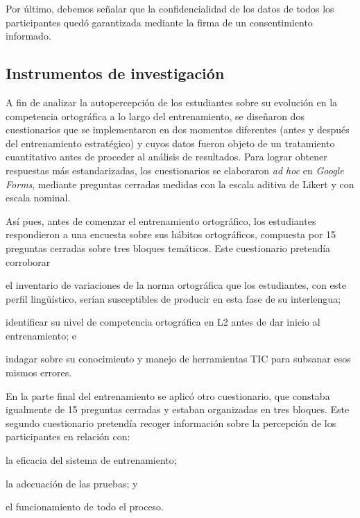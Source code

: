 \documentclass[spanish]{textolivre}
\begin{document}
Por último, debemos señalar que la confidencialidad de los datos de todos los participantes quedó garantizada mediante la firma de un consentimiento informado.

\subsection{Instrumentos de investigación}\label{sec-organizacao-latex}
A fin de analizar la autopercepción de los estudiantes sobre su evolución en la competencia ortográfica a lo largo del entrenamiento, se diseñaron dos cuestionarios que se implementaron en dos momentos diferentes (antes y después del entrenamiento estratégico) y cuyos datos fueron objeto de un tratamiento cuantitativo antes de proceder al análisis de resultados. Para lograr obtener respuestas más estandarizadas, los cuestionarios se elaboraron \textit{ad hoc} en \textit{Google Forms}, mediante preguntas cerradas medidas con la escala aditiva de Likert y con escala nominal.

Así pues, antes de comenzar el entrenamiento ortográfico, los estudiantes respondieron a una encuesta sobre sus hábitos ortográficos, compuesta por 15 preguntas cerradas sobre tres bloques temáticos. Este cuestionario pretendía corroborar 
\begin{enumerate*}[label=(\roman*)]
\item el inventario de variaciones de la norma ortográfica que los estudiantes, con este perfil lingüístico, serían susceptibles de producir en esta fase de su interlengua; 
\item identificar su nivel de competencia ortográfica en L2 antes de dar inicio al entrenamiento; e 
\item indagar sobre su conocimiento y manejo de herramientas TIC para subsanar esos mismos errores.
\end{enumerate*}

En la parte final del entrenamiento se aplicó otro cuestionario, que constaba igualmente de 15 preguntas cerradas y estaban organizadas en tres bloques. Este segundo cuestionario pretendía recoger información sobre la percepción de los participantes en relación con: 
\begin{enumerate*}[label=(\roman*)]
\item la eficacia del sistema de entrenamiento; 
\item la adecuación de las pruebas; y 
\item el funcionamiento de todo el proceso.
\end{enumerate*}
\end{document}
